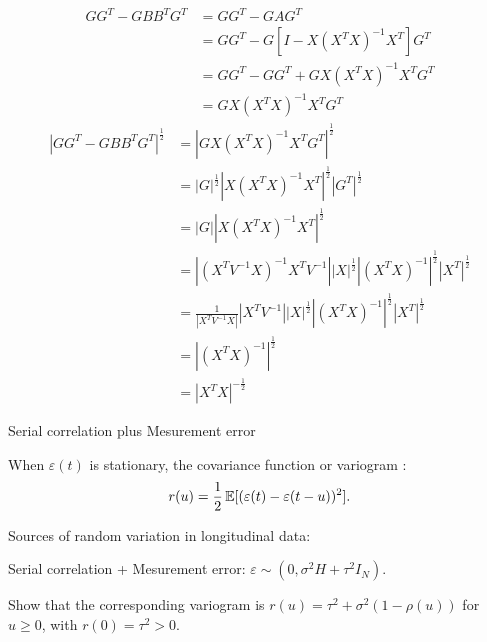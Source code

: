 \documentclass[UTF8,a4paper,10pt]{article}
\begin{document}
  \begin{solution}\,\\

    \begin{equation*}
      \begin{aligned}
        GG^{T}-GBB^{T}G^{T}
        &= GG^{T}-GAG^{T}\\
        &= GG^{T}-G[I-X(X^{T}X)^{-1}X^{T}]G^{T}\\
        &= GG^{T}-GG^{T} + GX(X^{T}X)^{-1}X^{T}G^{T}\\
        &= GX(X^{T}X)^{-1}X^{T}G^{T}
      \end{aligned}
    \end{equation*}
    \begin{equation*}
      \begin{aligned}
        |GG^{T}-GBB^{T}G^{T}|^{\frac{1}{2}} 
        &= |GX(X^{T}X)^{-1}X^{T}G^{T}|^{\frac{1}{2}} \\
        &= |G|^{\frac{1}{2}} |X(X^{T}X)^{-1}X^{T}|^{\frac{1}{2}} |G^{T}|^{\frac{1}{2}} \\
        &= |G||X(X^{T}X)^{-1}X^{T}|^{\frac{1}{2}} \\
        &= |(X^{T}V^{-1}X)^{-1}X^{T}V^{-1}|  |X|^{\frac{1}{2}}|(X^{T}X)^{-1}|^{\frac{1}{2}}|X^{T}|^{\frac{1}{2}}\\
        &=\frac{1}{|X^{T}V^{-1}X|}|X^{T}V^{-1}||X|^{\frac{1}{2}}|(X^{T}X)^{-1}|^{\frac{1}{2}}|X^{T}|^{\frac{1}{2}}\\
        &=|(X^{T}X)^{-1}|^{\frac{1}{2}}\\
        &=|X^{T}X|^{-\frac{1}{2}}
      \end{aligned}
    \end{equation*}
  \end{solution}
    
          
  \begin{Problem}[]{Serial correlation plus Mesurement error}

    When \(\varepsilon(t) \) is stationary, the covariance function or variogram :
    \begin{equation*}
      \begin{aligned}
        r(u) = \frac{1}{2}\operatorname{\mathbb{E}}[(\varepsilon(t)-\varepsilon(t-u))^2].
      \end{aligned}
    \end{equation*}

Sources of random variation in longitudinal data:

    Serial correlation + Mesurement error: \(\varepsilon \sim (0,\sigma^2 H+\tau^2I_N)\).

    Show that the corresponding variogram is \(r(u) = \tau^2+\sigma^2(1-\rho(u))\) for \(u\geq 0\), with \(r(0) = \tau^2>0\).

    
      \end{Problem} 
\end{document}
